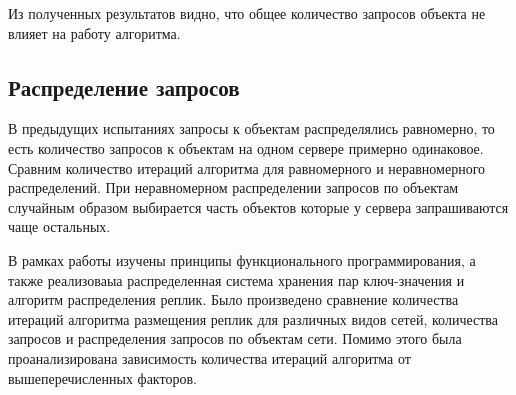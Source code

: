 			Из полученных результатов видно, что общее количество запросов объекта не влияет на работу алгоритма.

		\subsection{Распределение запросов}
			В предыдущих испытаниях запросы к объектам распределялись равномерно, то есть количество запросов к объектам на одном сервере примерно одинаковое. Сравним количество итераций 
			алгоритма для равномерного и неравномерного распределений. При неравномерном распределении запросов по объектам случайным образом выбирается часть объектов которые у сервера 
			запрашиваются чаще остальных.


	
\newpage		
		
\Conc

	В рамках работы изучены принципы функционального программирования, а также реализоваыа распределенная система хранения пар ключ-значения и алгоритм распределения реплик.
	Было произведено сравнение количества итераций алгоритма размещения реплик для различных видов сетей, количества запросов и распределения запросов по объектам сети.
	Помимо этого была проанализирована зависимость количества итераций алгоритма от вышеперечисленных факторов.
\newpage

\printbibliography[%
    heading=bibintoc%
]



